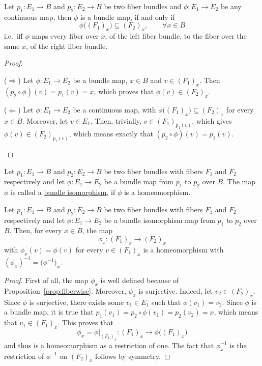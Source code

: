 \begin{proposition}\label{prop:fiberwise}
Let $p_1:E_1\to B$ and $p_2:E_2\to B$ be two fiber bundles and $\phi:E_1\to E_2$ be any continuous map, then $\phi$ is a bundle map, if and only if
\[\phi\big({(F_1)}_x\big)\subseteq{(F_2)}_x,\qquad\forall x\in B\]
i.e.\ iff $\phi$ maps every fiber over $x$, of the left fiber bundle, to the fiber over the same $x$, of the right fiber bundle.
\end{proposition}
\begin{proof}
\begin{b_item}
\item[($\Rightarrow$)] Let $\phi:E_1\to E_2$ be a bundle map, $x\in B$ and $v\in {(F_1)}_x$. Then $(p_2\circ\phi)(v)=p_1(v)=x$, which proves that $\phi(v)\in{(F_2)}_x$.
\item[($\Leftarrow$)] Let $\phi:E_1\to E_2$ be a continuous map, with $\phi\big({(F_1)}_x\big)\subseteq{(F_2)}_x$ for every $x\in B$. Moreover, let $v\in E_1$. Then, trivially, $v\in {(F_1)}_{p_1(v)}$, which gives $\phi(v)\in {(F_2)}_{p_1(v)}$, which means exactly that $(p_2\circ\phi)(v)=p_1(v)$.\qedhere
\end{b_item}
\end{proof}

\begin{definition}
Let $p_1:E_1\to B$ and $p_2:E_2\to B$ be two fiber bundles with fibers $F_1$ and $F_2$ respectively and let $\phi:E_1\to E_2$ be a bundle map from $p_1$ to $p_2$ over $B$. The map $\phi$ is called a \ul{bundle isomorphism}, if $\phi$ is a homeomorphism.
\end{definition}

\begin{proposition}
Let $p_1:E_1\to B$ and $p_2:E_2\to B$ be two fiber bundles with fibers $F_1$ and $F_2$ respectively and let $\phi:E_1\to E_2$ be a bundle isomorphism map from $p_1$ to $p_2$ over $B$. Then, for every $x\in B$, the map
\[\phi_x:{\left(F_1\right)}_x\to{\left(F_2\right)}_x\]
with $\phi_x(v)=\phi(v)$ for every $v\in\left(F_1\right)_x$ is a homeomorphism with $(\phi_x)^{-1}=\big(\phi^{-1}\big)_x$.
\end{proposition}
\begin{proof} First of all, the map $\phi_x$ is well defined because of Proposition~\ref{prop:fiberwise}. Moreover, $\phi_x$ is surjective. Indeed, let $v_2\in (F_2)_x$. Since $\phi$ is surjective, there exists some $v_1\in E_1$ such that $\phi(v_1)=v_2$. Since $\phi$ is a bundle map, it is true that $p_1(v_1)=p_2\circ\phi(v_1)=p_2(v_2)=x$, which means that $v_1\in(F_1)_x$. This proves that
\[\phi_x=\phi|_{{(F_1)}_x}:{(F_1)}_x\to\phi\big({(F_1)}_x\big)\]
and thus is a homeomorphism as a restriction of one. The fact that $\phi_x^{-1}$ is the restriction of $\phi^{-1}$ on ${(F_2)}_x$ follows by symmetry.
\end{proof}


